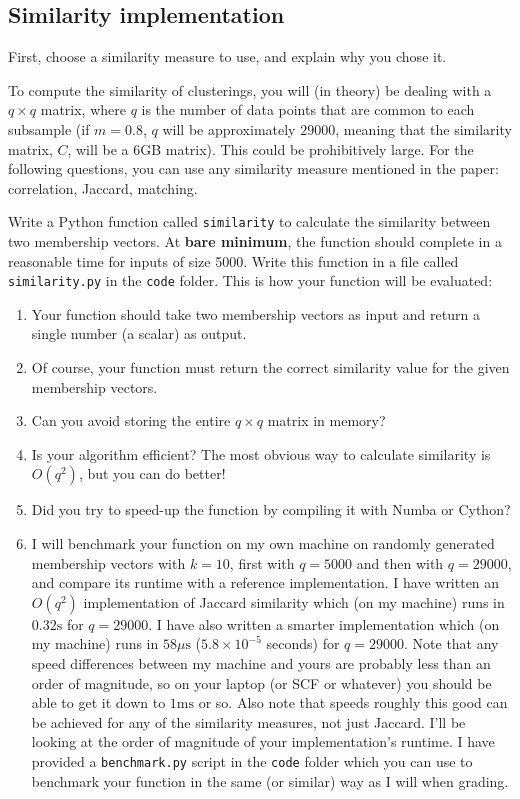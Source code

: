 \documentclass[letterpaper,12pt]{article}
\begin{document}
\newpage
\subsection{Similarity implementation}

First, choose a similarity measure to use, and explain why you chose it.

To compute the similarity of clusterings, you will (in theory) be dealing with a $q\times q$ matrix, where $q$ is the number of data points that are common to each subsample (if $m = 0.8$, $q$ will be approximately $29000$, meaning that the similarity matrix, $C$, will be a 6GB matrix). This could be prohibitively large. For the following questions, you can use any similarity measure mentioned in the paper: correlation, Jaccard, matching.

Write a Python function called \texttt{similarity} to calculate the similarity between two membership vectors. At \textbf{bare minimum}, the function should complete in a reasonable time for inputs of size 5000. Write this function in a file called \texttt{similarity.py} in the \texttt{code} folder. This is how your function will be evaluated:
\begin{enumerate}
    \item Your function should take two membership vectors as input and return a single number (a scalar) as output.
    \item Of course, your function must return the correct similarity value for the given membership vectors.
    \item Can you avoid storing the entire $q\times q$ matrix in memory?
    \item Is your algorithm efficient? The most obvious way to calculate similarity is $O(q^2)$, but you can do better!
    \item Did you try to speed-up the function by compiling it with Numba or Cython?
    \item I will benchmark your function on my own machine on randomly generated membership vectors with $k=10$, first with $q=5000$ and then with $q=29000$, and compare its runtime with a reference implementation. I have written an $O(q^2)$ implementation of Jaccard similarity which (on my machine) runs in $0.32\mathrm{s}$ for $q=29000$. I have also written a smarter implementation which (on my machine) runs in $58\mu \mathrm{s}$ ($5.8\times 10^{-5}$ seconds) for $q=29000$. Note that any speed differences between my machine and yours are probably less than an order of magnitude, so on your laptop (or SCF or whatever) you should be able to get it down to $1\textrm{ms}$ or so. Also note that speeds roughly this good can be achieved for any of the similarity measures, not just Jaccard. I'll be looking at the order of magnitude of your implementation's runtime. I have provided a \texttt{benchmark.py} script in the \texttt{code} folder which you can use to benchmark your function in the same (or similar) way as I will when grading.
\end{enumerate}
\end{document}
